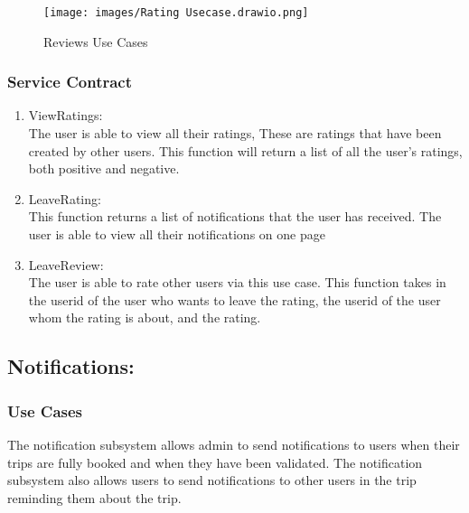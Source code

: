 \documentclass[hidelinks, 12pt, a4paper]{article}
\begin{document}
\begin{figure}[H]

      \centering
      \texttt{[image: images/Rating Usecase.drawio.png]}
      \caption{Reviews Use Cases}
      \label{fig:User UseCases}

\end{figure}
\newpage
\subsubsection{Service Contract}

\begin{enumerate}[label=U1.\arabic*]

      \item ViewRatings:\\
            The user is able to view all their ratings, These are ratings that have been created by other users. This function will return a list of all the user’s ratings, both positive and negative.\\

      \item LeaveRating:\\
            This function returns a list of notifications that the user has received. The user is able to view all their notifications on one page\\

      \item LeaveReview:\\
            The user is able to rate other users via this use case. This function takes in the userid of the user who wants to leave the rating, the userid of the user whom the rating is about, and the rating.\\

\end{enumerate}

\newpage
\subsection{Notifications:}
\subsubsection{Use Cases}
The notification subsystem allows admin to send notifications to users when their trips are fully booked and when they have been validated. The notification subsystem also allows users to send notifications to other users in the trip reminding them about the trip.
\vspace{1cm}
\end{document}
